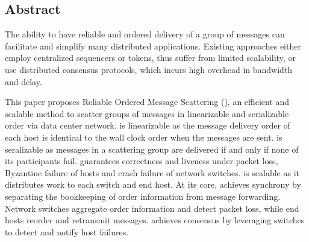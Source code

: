 \subsection*{Abstract}

The ability to have reliable and ordered delivery of a group of messages can facilitate and simplify many distributed applications.
Existing approaches either employ centralized sequencers or tokens, thus suffer from limited scalability, or use distributed consensus protocols, which incurs high overhead in bandwidth and delay.

This paper proposes Reliable Ordered Message Scattering (\sys), an efficient and scalable method to scatter groups of messages in linearizable and serializable order via data center network.
\sys is linearizable as the message delivery order of each host is identical to the wall clock order when the messages are sent.
\sys is seralizable as messages in a scattering group are delivered if and only if none of its participants fail.
\sys guarantees correctness and liveness under packet loss, Byzantine failure of hosts and crash failure of network switches.
\sys is scalable as it distributes work to each switch and end host.
At its core, \sys achieves synchrony by separating the bookkeeping of order information from message forwarding.
Network switches aggregate order information and detect packet loss, while end hosts reorder and retransmit messages.
\sys achieves consensus by leveraging switches to detect and notify host failures.




